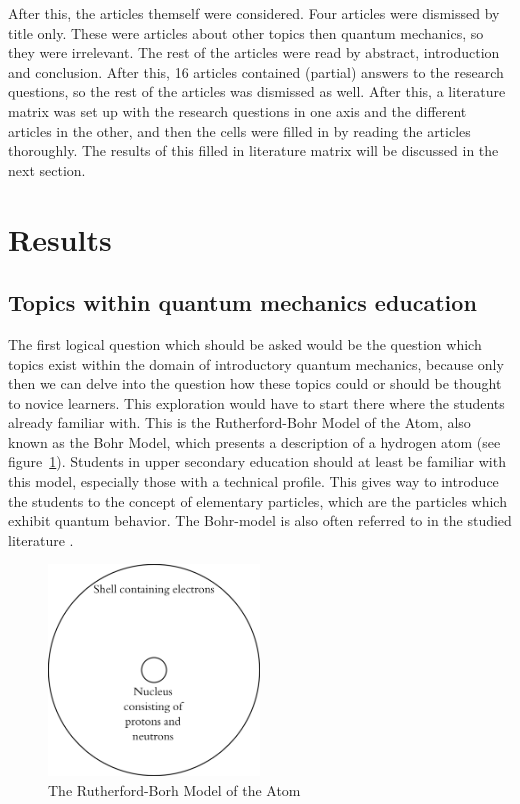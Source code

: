 \documentclass[11pt,twoside]{report} %
\begin{document}
After this, the articles themself were considered. Four articles were dismissed by title only. These were articles about other topics then quantum mechanics, so they were irrelevant. The rest of the articles were read by abstract, introduction and conclusion. After this, 16 articles contained (partial) answers to the research questions, so the rest of the articles was dismissed as well. After this, a literature matrix was set up with the research questions in one axis and the different articles in the other, and then the cells were filled in by reading the articles thoroughly. The results of this filled in literature matrix will be discussed in the next section.

\section{Results}

\subsection{Topics within quantum mechanics education}

The first logical question which should be asked would be the question which topics exist within the domain of introductory quantum mechanics, because only then we can delve into the question how these topics could or should be thought to novice learners. This exploration would have to start there where the students already familiar with. This is the Rutherford-Bohr Model of the Atom, also known as the Bohr Model, which presents a description of a hydrogen atom (see figure~\ref{fig:bohrmodel}). Students in upper secondary education should at least be familiar with this model, especially those with a technical profile. This gives way to introduce the students to the concept of elementary particles, which are the particles which exhibit quantum behavior. The Bohr-model is also often referred to in the studied literature \cite{dori, mckagan, muller, papaphotis1, papaphotis2}.

\begin{figure}[h!]
\centering
\includegraphics[width=0.5\textwidth]{bohrmodel}
\caption{The Rutherford-Borh Model of the Atom}
\label{fig:bohrmodel}
\end{figure}
\end{document}
